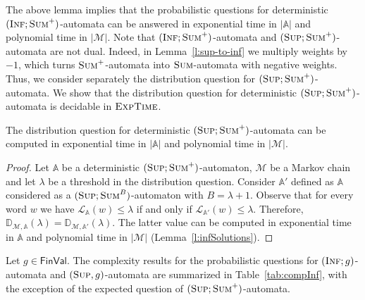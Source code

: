 \documentclass{lmcs}
\newcommand{\nestedA}{\mathbb{A}}
\newcommand{\valueL}[1]{\mathcal{L}_{{#1}}}
\newcommand{\EXPTIME}{\textsc{ExpTime}{}}
\newcommand{\fsum}{\textsc{Sum}}
\newcommand{\fBsum}[1]{\textsc{Sum}^{#1}}
\newcommand{\fsup}{\textsc{Sup}}
\newcommand{\finf}{\textsc{Inf}}
\newcommand{\const}{\lambda}
\newcommand{\FinVal}{\mathsf{FinVal}}
\newcommand{\distrib}{\mathbb{D}}
\newcommand{\markov}{\mathcal{M}}
\begin{document}
The above lemma implies that the probabilistic questions for deterministic $(\finf;\fsum^+)$-automata can be answered in exponential time in $|\nestedA|$ and polynomial time in $|\markov|$.
Note that $(\finf;\fsum^+)$-automata and $(\fsup;\fsum^+)$-automata are not dual.
Indeed, in Lemma~\ref{l:sup-to-inf} we multiply weights by $-1$, which turns $\fsum^+$-automata into $\fsum$-automata with negative weights.
Thus, we consider separately the distribution question for $(\fsup;\fsum^+)$-automata.
We show that the distribution question for deterministic $(\fsup;\fsum^+)$-automata is
decidable in $\EXPTIME$.



\begin{lem}\label{l:distributionSumPlusDecidable}
The distribution question for deterministic $(\fsup;\fsum^+)$-automata can be computed in exponential time in $|\nestedA|$ and polynomial time in $|\markov|$.
\end{lem}
\begin{proof}
Let $\nestedA$ be a deterministic $(\fsup;\fsum^+)$-automaton, $\markov$ be a Markov chain and let $\const$ be a threshold in the distribution question.
Consider $\nestedA'$ defined as $\nestedA$ considered as a $(\fsup;\fBsum{B})$-automaton with $B = \const+1$.
Observe that for every word $w$ we have $\valueL{\nestedA}(w) \leq \const$ if and only if
$\valueL{\nestedA'}(w) \leq \const$. Therefore,
$\distrib_{\markov,\nestedA}(\const) = \distrib_{\markov,\nestedA'}(\const)$.
The latter value can be computed in exponential time in $\nestedA$ and polynomial time in $|\markov|$ (Lemma~\ref{l:infSolutions}).
\end{proof}



\begin{thm}\label{th:compInf}
Let $g \in \FinVal$.
The complexity results for the probabilistic questions for $(\finf; g)$-automata
and $(\fsup,g)$-automata are summarized in Table~\ref{tab:compInf}, with the exception
of the expected question of $(\fsup; \fsum^+)$-automata.
\end{thm}
\end{document}
